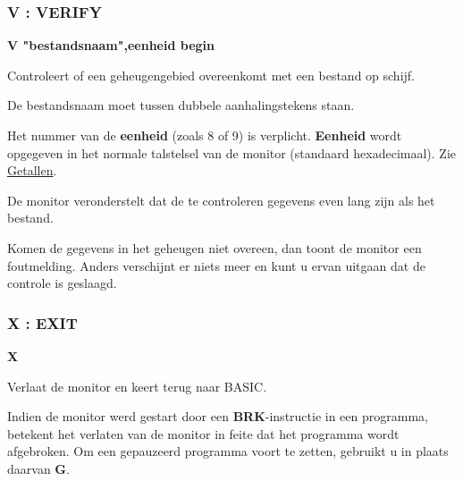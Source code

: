 
\subsubsection{V : VERIFY}
\begin{description}[leftmargin=2cm,style=nextline]
\item [Formaat:] {\bf V "bestandsnaam",eenheid begin}\item [Gebruik:] Controleert of een geheugengebied overeenkomt met een bestand op schijf.

\item [Opmerkingen:] De bestandsnaam moet tussen dubbele aanhalingstekens staan.

    Het nummer van de {\bf eenheid} (zoals 8 of 9) is verplicht. {\bf Eenheid} wordt opgegeven in het normale talstelsel van de monitor (standaard hexadecimaal). Zie \hyperref[sec:numbers]{Getallen}.

    De monitor veronderstelt dat de te controleren gegevens even lang zijn als het bestand.

    Komen de gegevens in het geheugen niet overeen, dan toont de monitor een foutmelding. Anders verschijnt er niets meer en kunt u ervan uitgaan dat de controle is geslaagd.

\end{description}


\subsubsection{X : EXIT}
\begin{description}[leftmargin=2cm,style=nextline]
\item [Formaat:] {\bf X}\item [Gebruik:] Verlaat de monitor en keert terug naar BASIC.

\item [Opmerkingen:] Indien de monitor werd gestart door een {\bf BRK}-instructie in een programma, betekent het verlaten van de monitor in feite dat het programma wordt afgebroken. Om een gepauzeerd programma voort te zetten, gebruikt u in plaats daarvan {\bf G}.

\end{description}

